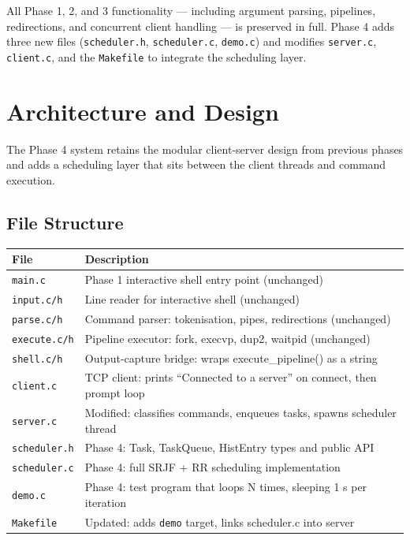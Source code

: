 \documentclass[12pt]{article}
\begin{document}
All Phase 1, 2, and 3 functionality --- including argument parsing, pipelines,
redirections, and concurrent client handling --- is preserved in full. Phase 4 adds
three new files (\texttt{scheduler.h}, \texttt{scheduler.c}, \texttt{demo.c}) and
modifies \texttt{server.c}, \texttt{client.c}, and the \texttt{Makefile} to integrate
the scheduling layer.

\section{Architecture and Design}

The Phase 4 system retains the modular client-server design from previous phases and
adds a scheduling layer that sits between the client threads and command execution.

\subsection{File Structure}

\begin{center}
\begin{tabular}{ll}
\toprule
\textbf{File} & \textbf{Description} \\
\midrule
\texttt{main.c}          & Phase 1 interactive shell entry point (unchanged) \\
\texttt{input.c/h}       & Line reader for interactive shell (unchanged) \\
\texttt{parse.c/h}       & Command parser: tokenisation, pipes, redirections (unchanged) \\
\texttt{execute.c/h}     & Pipeline executor: fork, execvp, dup2, waitpid (unchanged) \\
\texttt{shell.c/h}       & Output-capture bridge: wraps execute\_pipeline() as a string \\
\texttt{client.c}        & TCP client: prints ``Connected to a server'' on connect, then prompt loop \\
\texttt{server.c}        & Modified: classifies commands, enqueues tasks, spawns scheduler thread \\
\texttt{scheduler.h}     & Phase 4: Task, TaskQueue, HistEntry types and public API \\
\texttt{scheduler.c}     & Phase 4: full SRJF + RR scheduling implementation \\
\texttt{demo.c}          & Phase 4: test program that loops N times, sleeping 1 s per iteration \\
\texttt{Makefile}        & Updated: adds \texttt{demo} target, links scheduler.c into server \\
\bottomrule
\end{tabular}
\end{center}
\end{document}
